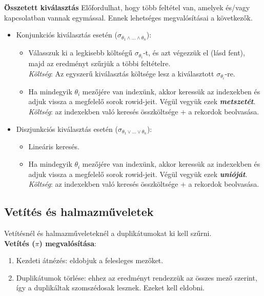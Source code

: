 \documentclass[12pt,margin=0px]{article}
\begin{document}
	\noindent \textbf{Összetett kiválasztás}
    Előfordulhat, hogy több feltétel van, amelyek és/vagy kapcsolatban vannak egymással. Ennek lehetséges megvalósításai a következők.
	\begin{itemize}
		\item	Konjunkciós kiválasztás esetén ($\sigma_{\theta_{1} \wedge ... \wedge \theta_{n}}$):
		\begin{itemize}
			\item	Válasszuk ki a legkisebb költségű $\sigma_{\theta_{i}}$-t, és azt végezzük el (lásd fent),
			majd az eredményt szűrjük a többi feltételre. \\
            \emph{Költség}: Az egyszerű kiválasztás költsége lesz a kiválasztott $\sigma_{\theta_{i}}$-re.
			
			\item	Ha mindegyik $\theta_{i}$ mezőjére van indexünk, akkor keressük az indexekben és adjuk vissza a megfelelő
			sorok rowid-jeit. Végül vegyük ezek \emph{\textbf{metszetét}}. \\
            \emph{Költség}: az indexekben való keresés összköltsége + a rekordok beolvasása.
		\end{itemize}
		
		\item	Diszjunkciós kiválasztás esetén ($\sigma_{\theta_{1} \vee ... \vee \theta_{n}}$):
		\begin{itemize}
			\item	Lineáris keresés.
				
			\item	Ha mindegyik $\theta_{i}$ mezőjére van indexünk, akkor keressük az indexekben és adjuk vissza a megfelelő
			sorok rowid-jeit. Végül vegyük ezek \emph{\textbf{unióját}}. \\
            \emph{Költség}: az indexekben való keresés összköltsége + a rekordok beolvasása.
			\end{itemize}
	\end{itemize}
	
	\subsection*{Vetítés és halmazműveletek}
	
	Vetítésnél és halmazműveleteknél a duplikátumokat ki kell szűrni.\\
	
	\noindent \textbf{Vetítés ($\pi$) megvalósítása}:
	
	\begin{enumerate}
		\item	Kezdeti átnézés: eldobjuk a felesleges mezőket.
		\item	Duplikátumok törlése: ehhez az eredményt rendezzük az összes mező szerint, így a duplikáltak szomszédosak
		lesznek. Ezeket kell eldobni.
	\end{enumerate}
	
\end{document}
